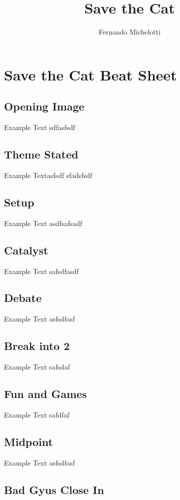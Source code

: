 \documentclass[12pt,a4paper,final,oneside]{book}
\author{Fernando Michelotti}
\title{Save the Cat}
\begin{document}
\section{Save the Cat Beat Sheet}

\subsection{Opening Image}

Example Text
sdfasfsdf


\subsection{Theme Stated}

Example Textasfsdf
sfadsfsdf


\subsection{Setup}

Example Text
asdfsafsadf


\subsection{Catalyst}

Example Text
safsdfasdf

\subsection{Debate}

Example Text
asfsdfasf

\subsection{Break into 2}

Example Text
safsdaf


\subsection{Fun and Games}

Example Text
safdfaf

\subsection{Midpoint}

Example Text
asfsdfasf

\subsection{Bad Gyus Close In}
\end{document}
